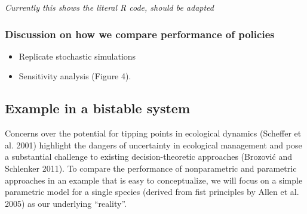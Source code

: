 \documentclass[author-year, review]{elsarticle} %
\newenvironment{Shaded}{}{}
\newcommand{\KeywordTok}[1]{\textcolor[rgb]{0.00,0.44,0.13}{\textbf{{#1}}}}
\newcommand{\DataTypeTok}[1]{\textcolor[rgb]{0.56,0.13,0.00}{{#1}}}
\newcommand{\DecValTok}[1]{\textcolor[rgb]{0.25,0.63,0.44}{{#1}}}
\newcommand{\StringTok}[1]{\textcolor[rgb]{0.25,0.44,0.63}{{#1}}}
\newcommand{\CommentTok}[1]{\textcolor[rgb]{0.38,0.63,0.69}{\textit{{#1}}}}
\newcommand{\NormalTok}[1]{{#1}}
\begin{document}
\begin{Shaded}
\end{Shaded}

\emph{Currently this shows the literal R code, should be adapted}

\subsubsection{Discussion on how we compare performance of policies}

\begin{itemize}
\itemsep1pt\parskip0pt
\item
  Replicate stochastic simulations
\item
  Sensitivity analysis (Figure 4).
\end{itemize}

\subsection{Example in a bistable system}

Concerns over the potential for tipping points in ecological dynamics
(Scheffer et al. 2001) highlight the dangers of uncertainty in
ecological management and pose a substantial challenge to existing
decision-theoretic approaches (Brozović and Schlenker 2011). To compare
the performance of nonparametric and parametric approaches in an example
that is easy to conceptualize, we will focus on a simple parametric
model for a single species (derived from fist principles by Allen et al.
2005) as our underlying ``reality''.
\end{document}
